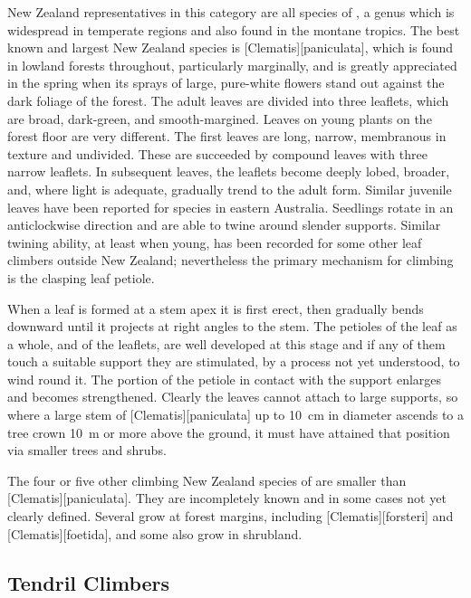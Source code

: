 New Zealand representatives in this category are all species of , a genus which is widespread in temperate regions and also found in the montane tropics.
The best known and largest New Zealand species is [Clematis][paniculata], which is found in lowland forests throughout, particularly marginally, and is greatly appreciated in the spring when its sprays of large, pure-white flowers stand out against the dark foliage of the forest.
The adult leaves are divided into three leaflets, which are broad, dark-green, and smooth-margined.
Leaves on young plants on the forest floor are very different.
The first leaves are long, narrow, membranous in texture and undivided.
These are succeeded by compound leaves with three narrow leaflets.
In subsequent leaves, the leaflets become deeply lobed, broader, and, where light is adequate, gradually trend to the adult form.
Similar juvenile leaves have been reported for  species in eastern Australia.
Seedlings rotate in an anticlockwise direction and are able to twine around slender supports.
Similar twining ability, at least when young, has been recorded for some other leaf climbers outside New Zealand; nevertheless the primary mechanism for climbing is the clasping leaf petiole.

When a leaf is formed at a stem apex it is first erect, then gradually bends downward until it projects at right angles to the stem.
The petioles of the leaf as a whole, and of the leaflets, are well developed at this stage and if any of them touch a suitable support they are stimulated, by a process not yet understood, to wind round it.
The portion of the petiole in contact with the support enlarges and becomes strengthened.
Clearly the leaves cannot attach to large supports, so where a large stem of [Clematis][paniculata] up to \SI{10}{\centi\metre} in diameter ascends to a tree crown \SI{10}{\metre} or more above the ground, it must have attained that position via smaller trees and shrubs.

The four or five other climbing New Zealand species of  are smaller than [Clematis][paniculata].
They are incompletely known and in some cases not yet clearly defined.
Several grow at forest margins, including [Clematis][forsteri] and [Clematis][foetida], and some also grow in shrubland.

\subsection{Tendril Climbers}

